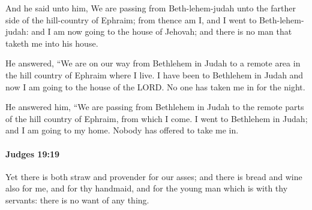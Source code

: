 			\begin{versebox}
					\item[BHS] 
					\item[ASV] And he said unto him, We are passing from Beth-lehem-judah unto the farther side of the hill-country of Ephraim; from thence am I, and I went to Beth-lehem-judah: and I am now going to the house of Jehovah; and there is no man that taketh me into his house.
					\item[NIV] He answered, “We are on our way from Bethlehem in Judah to a remote area in the hill country of Ephraim where I live. I have been to Bethlehem in Judah and now I am going to the house of the LORD. No one has taken me in for the night.
					\item[NRSV] He answered him, “We are passing from Bethlehem in Judah to the remote parts of the hill country of Ephraim, from which I come. I went to Bethlehem in Judah; and I am going to my home. Nobody has offered to take me in.
			\end{versebox}

		\paragraph{Judges 19:19} %
			\label{JUDGES-19-19}

			Yet there is both straw and provender for our asses; and there is bread and wine also for me, and for thy handmaid, and for the young man which is with thy servants: there is no want of any thing.

